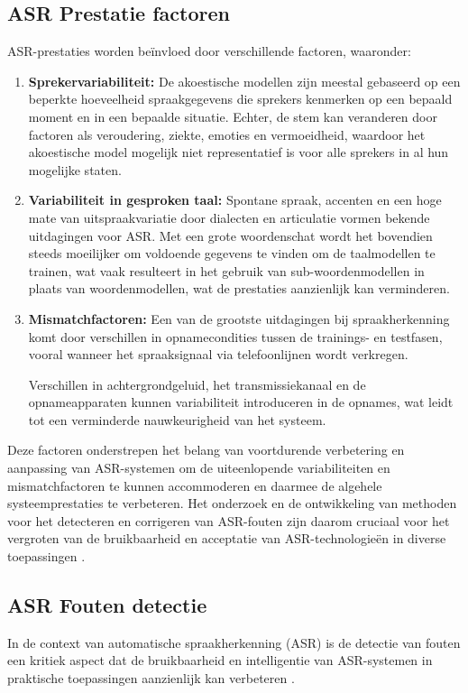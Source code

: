 \subsection{ASR Prestatie factoren}
ASR-prestaties worden beïnvloed door verschillende factoren, waaronder:
\begin{enumerate}[label=\arabic*.]
    \item \textbf{Sprekervariabiliteit:}
    De akoestische modellen zijn meestal gebaseerd op een beperkte hoeveelheid spraakgegevens die sprekers kenmerken op een bepaald moment en in een bepaalde situatie. Echter, de stem kan veranderen door factoren als veroudering, ziekte, emoties en vermoeidheid, waardoor het akoestische model mogelijk niet representatief is voor alle sprekers in al hun mogelijke staten.
    
    \item \textbf{Variabiliteit in gesproken taal:}
    Spontane spraak, accenten en een hoge mate van uitspraakvariatie door dialecten en articulatie vormen bekende uitdagingen voor ASR. Met een grote woordenschat wordt het bovendien steeds moeilijker om voldoende gegevens te vinden om de taalmodellen te trainen, wat vaak resulteert in het gebruik van sub-woordenmodellen in plaats van woordenmodellen, wat de prestaties aanzienlijk kan verminderen.
    
    \item \textbf{Mismatchfactoren:}
    Een van de grootste uitdagingen bij spraakherkenning komt door verschillen in opnamecondities tussen de trainings- en testfasen, vooral wanneer het spraaksignaal via telefoonlijnen wordt verkregen. 
    
    Verschillen in achtergrondgeluid, het transmissiekanaal en de opnameapparaten kunnen variabiliteit introduceren in de opnames, wat leidt tot een verminderde nauwkeurigheid van het systeem.
\end{enumerate} 


Deze factoren onderstrepen het belang van voortdurende verbetering en aanpassing van ASR-systemen om de uiteenlopende variabiliteiten en mismatchfactoren te kunnen accommoderen en daarmee de algehele systeemprestaties te verbeteren. Het onderzoek en de ontwikkeling van methoden voor het detecteren en corrigeren van ASR-fouten zijn daarom cruciaal voor het vergroten van de bruikbaarheid en acceptatie van ASR-technologieën in diverse toepassingen \autocite{Errattahi_2018}.

\subsection{ASR Fouten detectie}
In de context van automatische spraakherkenning (ASR) is de detectie van fouten een kritiek aspect dat de bruikbaarheid en intelligentie van ASR-systemen in praktische toepassingen aanzienlijk kan verbeteren \autocite{jiang2005confidence}.

